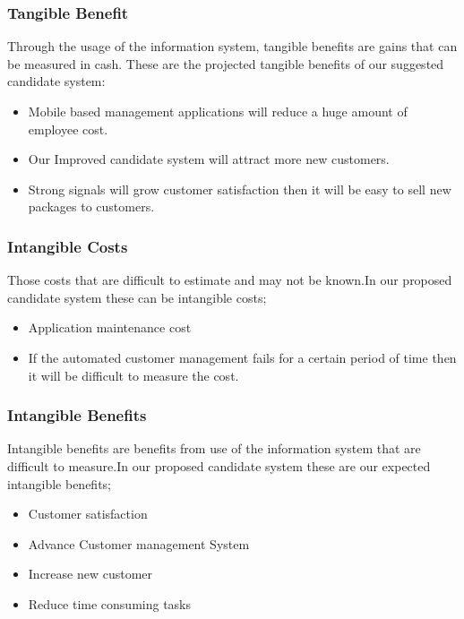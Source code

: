 \begin{spacing}{1}
\subsubsection {Tangible Benefit}
Through the usage of the information system, tangible benefits are gains that can be measured in cash.
These are the projected tangible benefits of our suggested candidate system:

\begin {itemize}
\item Mobile based management applications will reduce a huge amount of employee cost.
\item Our Improved candidate system will attract more new customers.
\item Strong signals will grow customer satisfaction then it will be easy to sell new packages to customers.
\end {itemize}


\subsubsection {Intangible Costs }
Those costs that are difficult to estimate and may not be known.In our proposed candidate system these can be  intangible costs;
\begin {itemize}
\item Application maintenance cost
\item If the automated customer management fails for a certain period of time then it will be difficult to measure the cost.
\end {itemize}

\subsubsection {Intangible Benefits }
Intangible benefits are benefits from use of the information system that are difficult to measure.In our proposed candidate system these are our expected intangible benefits;

\begin {itemize}
\item Customer satisfaction
\item Advance Customer management System
\item Increase new customer 
\item Reduce time consuming tasks
\end {itemize}


\end{spacing}
